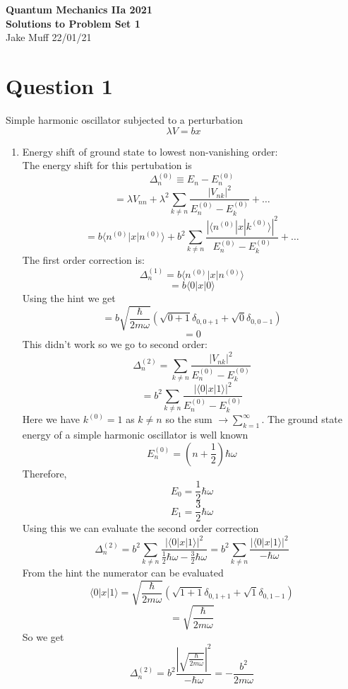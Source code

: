 \documentclass[12pt]{article}
\begin{document}
\normalsize

\baselineskip 14pt

\begin{center}
{\Large {\bf Quantum Mechanics IIa 2021 \ \ \\ Solutions to Problem Set 1}} \\
Jake Muff
22/01/21
\end{center}
\section*{Question 1}
Simple harmonic oscillator subjected to a perturbation 
$$ \lambda V = bx $$
\begin{enumerate}
    \item Energy shift of ground state to lowest non-vanishing order: \\
    
    The energy shift for this pertubation is 
    $$ \Delta_n^{(0)} \equiv E_n - E_n^{(0)} $$
    $$ = \lambda V_{nn} + \lambda^2 \sum_{k \neq n} \frac{|V_{nk}|^2}{E_n^{(0)} - E_k^{(0)} } + \ldots $$
    $$ = b \langle n^{(0)} | x | n^{(0)} \rangle + b^2 \sum_{k \neq n} \frac{| \langle n^{(0)} | x| k^{(0)} \rangle |^2}{E_n^{(0)} - E_k^{(0)} } + \ldots $$
    The first order correction is: 
    $$ \Delta_n^{(1)} = b \langle n^{(0)} | x | n^{(0)} \rangle $$
    $$ = b \langle 0 | x | 0 \rangle $$
    Using the hint we get 
    $$ = b \sqrt{\frac{\hbar}{2 m \omega} } ( \sqrt{0+1} \delta_{0,0+1} + \sqrt{0} \delta_{0, 0-1} ) $$
    $$ = 0 $$
    This didn't work so we go to second order: 
    $$ \Delta_n^{(2)} = \sum_{k \neq n} \frac{|V_{nk}|^2}{E_n^{(0)} - E_k^{(0)}} $$
    $$ = b^2 \sum_{k \neq n} \frac{| \langle 0 | x | 1 \rangle |^2 }{E_n^{(0)} - E_k^{(0)} } $$
    Here we have $k^{(0)} = 1$ as $k \neq n$ so the sum $\rightarrow \sum_{k=1}^{\infty} $. The ground state energy of a simple harmonic oscillator is well known 
    $$ E_n^{(0)} = (n + \frac{1}{2}) \hbar \omega $$
    Therefore, 
    $$ E_0 = \frac{1}{2} \hbar \omega $$
    $$ E_1 = \frac{3}{2} \hbar \omega $$
    Using this we can evaluate the second order correction 
    $$ \Delta_n^{(2)} = b^2 \sum_{k \neq n} \frac{| \langle 0 | x | 1 \rangle |^2}{\frac{1}{2} \hbar \omega - \frac{3}{2} \hbar \omega} = b^2 \sum_{k \neq n} \frac{| \langle 0 | x| 1 \rangle |^2 }{- \hbar \omega} $$
    From the hint the numerator can be evaluated 
    $$ \langle 0 | x | 1 \rangle = \sqrt{\frac{\hbar}{2 m \omega}} ( \sqrt{1+1} \delta_{0,1+1} + \sqrt{1}\delta_{0, 1-1} ) $$
    $$ = \sqrt{\frac{\hbar}{2 m \omega}} $$
    So we get 
    $$ \Delta_n^{(2)} = b^2 \frac{|\sqrt{\frac{\hbar}{2 m \omega}}|^2}{- \hbar \omega} = - \frac{b^2}{2 m \omega} $$


\end{enumerate}
\end{document}
